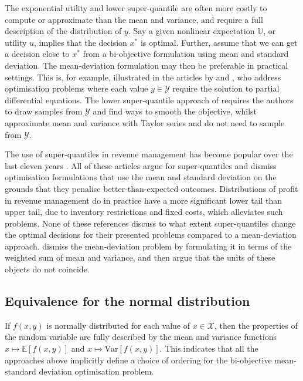 \documentclass[main.tex]{subfiles}
\begin{document}
The exponential utility and lower super-quantile are often more costly
to compute or approximate than the mean and variance, and require a
full description of the distribution of $y$.
Say a given nonlinear expectation $\mathbb{U}$, or utility $u$,
implies that the decision $x^*$ is optimal. Further, assume that we can get a
decision close to $x^*$ from a bi-objective formulation using mean and standard
deviation. The mean-deviation formulation may then be preferable in
practical settings.
This is, for example, illustrated in the articles by
\citet{kouri2016risk} and \citet{alexanderian2017mean}, who address optimisation problems
where each value $y\in\mathcal{Y}$ require the solution to partial
differential equations.
The lower super-quantile approach of \citet{kouri2016risk}
requires the authors to draw samples from $\mathcal{Y}$ and find ways
to smooth the objective,
whilst \citet{alexanderian2017mean} approximate mean and variance
with Taylor series and do not need to sample from $\mathcal{Y}$.


The use of super-quantiles in revenue management has become popular
over the last eleven years
\citep{wu2014risk,xue2015optimal,zhou2008optimal,ahmed2007coherent}.
All of these articles argue for super-quantiles and dismiss
optimisation formulations that use the mean and standard deviation
on the grounds that they penalise better-than-expected outcomes.
Distributions of profit in revenue management do in practice
have a more significant lower tail than upper tail, due to inventory
restrictions and fixed costs, which alleviates such problems.
None of these references discuss to what extent super-quantiles change the
optimal decisions for their presented problems compared to a
mean-deviation approach. \citet{choi2011multiproduct}
dismiss the mean-deviation problem by formulating it in terms of the weighted sum of mean and
variance, and then argue that the units of these objects do not
coincide.

\subsection{Equivalence for the normal distribution}
If $f(x,y)$ is normally distributed for each value of
$x\in\mathcal{X}$, then the properties of the random variable are fully
described by the mean and variance functions $x\mapsto
\mathbb{E}[f(x,y)]$ and $x\mapsto \mbox{Var}[f(x,y)]$. This
indicates that all the approaches above implicitly define a
choice of ordering for the bi-objective mean-standard deviation
optimisation problem.
\end{document}
